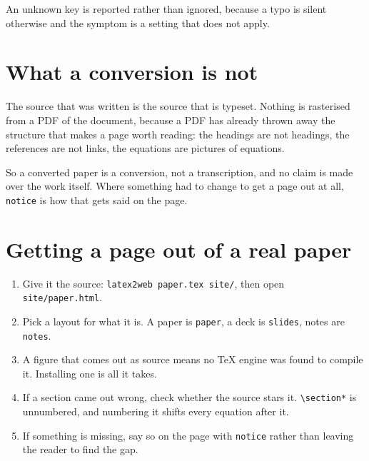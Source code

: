 \documentclass[11pt]{article}
\begin{document}
An unknown key is reported rather than ignored, because a typo is silent
otherwise and the symptom is a setting that does not apply.

\section{What a conversion is not}

The source that was written is the source that is typeset. Nothing is rasterised
from a PDF of the document, because a PDF has already thrown away the structure
that makes a page worth reading: the headings are not headings, the references
are not links, the equations are pictures of equations.

So a converted paper is a conversion, not a transcription, and no claim is made
over the work itself. Where something had to change to get a page out at all,
\texttt{notice} is how that gets said on the page.

\section{Getting a page out of a real paper}

\begin{enumerate}
  \item Give it the source: \texttt{latex2web paper.tex site/}, then open
    \texttt{site/paper.html}.
  \item Pick a layout for what it is. A paper is \texttt{paper}, a deck is
    \texttt{slides}, notes are \texttt{notes}.
  \item A figure that comes out as source means no TeX engine was found to
    compile it. Installing one is all it takes.
  \item If a section came out wrong, check whether the source stars it.
    \texttt{\textbackslash section*} is unnumbered, and numbering it shifts every
    equation after it.
  \item If something is missing, say so on the page with \texttt{notice} rather
    than leaving the reader to find the gap.
\end{enumerate}
\end{document}
